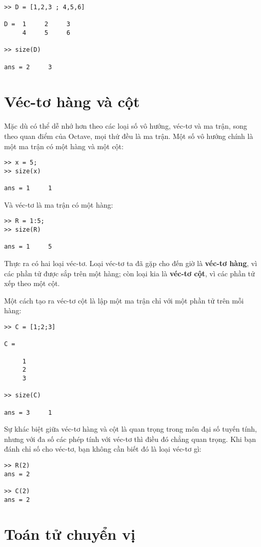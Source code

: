 \documentclass[12pt]{book}
\begin{document}
\begin{verbatim}
>> D = [1,2,3 ; 4,5,6]

D =  1     2     3
     4     5     6

>> size(D)

ans = 2     3
\end{verbatim}
%

\section{Véc-tơ hàng và cột}

Mặc dù có thể dễ nhớ hơn theo các loại số vô hướng, véc-tơ và ma trận,
song theo quan điểm của Octave, mọi thứ đều là ma trận. Một số 
vô hướng chính là một ma trận có một hàng và một cột:

\begin{verbatim}
>> x = 5;
>> size(x)

ans = 1     1
\end{verbatim}
%
Và véc-tơ là ma trận có một hàng:

\begin{verbatim}
>> R = 1:5;
>> size(R)

ans = 1     5
\end{verbatim}
%
Thực ra có hai loại véc-tơ. Loại véc-tơ ta đã gặp cho đến giờ là 
{\bf véc-tơ hàng}, vì các phần tử được sắp trên một hàng; còn
loại kia là {\bf véc-tơ cột}, vì các phần tử xếp theo một cột.

Một cách tạo ra véc-tơ cột là lập một ma trận chỉ với một phần tử
trên mỗi hàng:

\begin{verbatim}
>> C = [1;2;3]

C =

     1
     2
     3

>> size(C)

ans = 3     1
\end{verbatim}
%
Sự khác biệt giữa véc-tơ hàng và cột là quan trọng trong môn
đại số tuyến tính, nhưng với đa số các phép tính với véc-tơ thì
điều đó chẳng quan trọng. Khi bạn đánh chỉ số cho véc-tơ, bạn
không cần biết đó là loại véc-tơ gì:

\begin{verbatim}
>> R(2)
ans = 2

>> C(2)
ans = 2
\end{verbatim}



\section{Toán tử chuyển vị}
\end{document}
